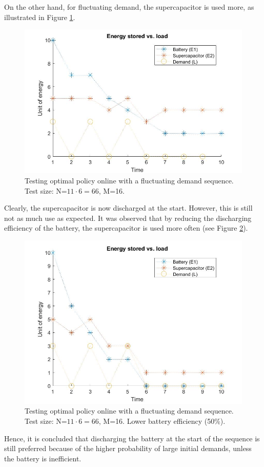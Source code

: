 \documentclass[conference]{IEEEtran}
\begin{document}
On the other hand, for fluctuating demand, the supercapacitor is used more, as illustrated in Figure \ref{fig:FluctuatingDemand}.
\begin{figure}[htbp]
\centerline{\includegraphics[scale=0.2]{EnergyStoredvsFluctuatingLoad(E1=10,E2=5).jpg}}
\caption{Testing optimal policy online with a fluctuating demand sequence. Test size: N=$11\cdot6=66$, M=16.}
\label{fig:FluctuatingDemand}
\end{figure} Clearly, the supercapacitor is now discharged at the start. However, this is still not as much use as expected. It was observed that by reducing the discharging efficiency of the battery, the supercapacitor is used more often (see Figure \ref{fig:FluctuatingDemand_LowBattEff}).
\begin{figure}[htbp]
\centerline{\includegraphics[scale=0.2]{EnergyStoredvsFluctuatingLoad_LowBattEff(E1=10,E2=5).jpg}}
\caption{Testing optimal policy online with a fluctuating demand sequence. Test size: N=$11\cdot6=66$, M=16. Lower battery efficiency (50\%).}
\label{fig:FluctuatingDemand_LowBattEff}
\end{figure} Hence, it is concluded that discharging the battery at the start of the sequence is still preferred because of the higher probability of large initial demands, unless the battery is inefficient.
\end{document}
